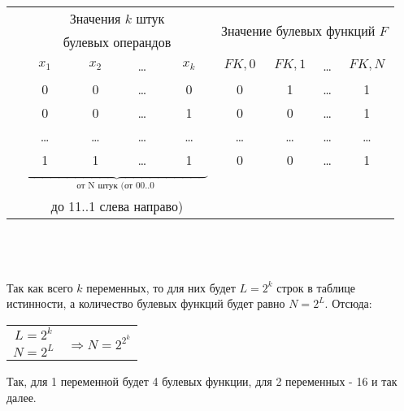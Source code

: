 \begin{minipage}[l]{9cm}
\begin{tabular}{c|c|c|c|c|c|c|c|c|}
\hhline{~--------}
& \multicolumn{4}{c|}{Значения $k$ штук} & \multicolumn{4}{c|}{\multirow{2}{*}{Значение булевых функций $F$}} \\
& \multicolumn{4}{c|}{булевых операндов} & \multicolumn{4}{c|}{}\\
\hhline{~--------}
& $x_1$ & $x_2$ & \dots & $x_k$ & $FK,0$ & $FK,1$ & \dots & $FK,N$ \\
\hhline{~--------}
 & 0 & 0 & \dots & 0 & 0 & 1 & \dots & 1\\
& 0 & 0 & \dots & 1 & 0 & 0 & \dots & 1\\
& \dots & \dots & \dots & \dots & \dots & \dots & \dots & \dots\\
\multirow{4}{*}{} & 1 & 1 & \dots & 1 & 0 & 0 & \dots & 1\\

\hhline{~--------}
\multicolumn{5}{c}{} & \multicolumn{4}{c}{$\underbrace{\qquad \qquad \qquad \qquad \qquad \qquad \qquad}_{\mbox{от N штук (от 00..0 }}$} \\
\multicolumn{5}{c}{} & \multicolumn{4}{c}{до 11..1 слева направо)}
\end{tabular}
\end{minipage}
\\
\\
\\
Так как всего $k$ переменных, то для них будет $L = 2^k$ строк в таблице истинности, а количество булевых функций будет равно $N = 2^L$. Отсюда:
\\
\begin{center}
\begin{tabular}{c c}
$L = 2^k$ & \multirow{2}{*}{$\Rightarrow N = 2^{2^{k}}$} \\
$N = 2^L$ & \\
\end{tabular}
\end{center}
Так, для 1 переменной будет 4 булевых функции, для 2 переменных - 16 и так далее.
